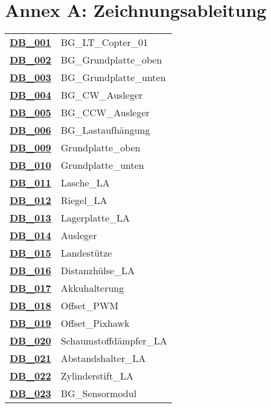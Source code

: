 \chapter{Annex A: Zeichnungsableitung}

	\begin{longtable}{rl}
	\textbf{\hyperref[db001]{DB\_001}}	 	& BG\_LT\_Copter\_01 \\
	\textbf{\hyperref[db002]{DB\_002}} 		& BG\_Grundplatte\_oben \\
	\textbf{\hyperref[db003]{DB\_003}} 		& BG\_Grundplatte\_unten \\
	\textbf{\hyperref[db004]{DB\_004}} 		& BG\_CW\_Ausleger \\
	\textbf{\hyperref[db005]{DB\_005}}		& BG\_CCW\_Ausleger \\
	\textbf{\hyperref[db006]{DB\_006}}		& BG\_Lastaufhängung \\
	\textbf{\hyperref[db009]{DB\_009}}		& Grundplatte\_oben \\
	\textbf{\hyperref[db010]{DB\_010}}		& Grundplatte\_unten \\
	\textbf{\hyperref[db011]{DB\_011}}		& Lasche\_LA \\
	\textbf{\hyperref[db012]{DB\_012}}		& Riegel\_LA \\
	\textbf{\hyperref[db013]{DB\_013}}		& Lagerplatte\_LA \\
	\textbf{\hyperref[db014]{DB\_014}}		& Ausleger \\
	\textbf{\hyperref[db015]{DB\_015}}		& Landestütze \\
	\textbf{\hyperref[db016]{DB\_016}}		& Distanzhülse\_LA \\
	\textbf{\hyperref[db017]{DB\_017}}		& Akkuhalterung \\
	\textbf{\hyperref[db018]{DB\_018}}		& Offset\_PWM \\
	\textbf{\hyperref[db019]{DB\_019}}		& Offset\_Pixhawk \\
	\textbf{\hyperref[db020]{DB\_020}}		& Schaumstoffdämpfer\_LA \\
	\textbf{\hyperref[db021]{DB\_021}}		& Abstandshalter\_LA \\
	\textbf{\hyperref[db022]{DB\_022}}		& Zylinderstift\_LA \\
	\textbf{\hyperref[db023]{DB\_023}}		& BG\_Sensormodul \\
	

\end{longtable}
